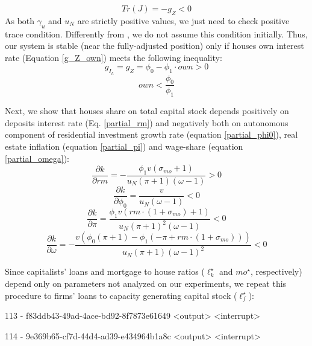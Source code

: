 \documentclass[11pt]{article}
\begin{document}
$$
Tr(J) = -g_Z < 0
$$
As both \(\gamma_u\) and \(u_N\) are strictly positive values, we just need to check positive trace condition.
Differently from \textcite{freitas_growth_2015}, we do not assume this condition initially.
Thus, our system is stable (near the fully-adjusted position) only if houses own interest rate (Equation \ref{g_Z_own}) meets the following inequality:
$$
g_{I_h} = g_Z = \phi_0 - \phi_1\cdot own > 0
$$
\begin{equation}
own < \frac{\phi_0}{\phi_1}
\end{equation}


Next, we show that houses share on total capital stock depends positively on deposits interest rate (Eq. \ref{partial_rm}) and negatively both on autonomous component of residential investment growth rate (equation \ref{partial_phi0}), real estate inflation (equation \ref{partial_pi}) and wage-share (equation \ref{partial_omega}):
\begin{equation}
\label{partial_rm}
\frac{\partial k}{\partial rm} = - \frac{\phi_{1} v \left(\sigma_{mo} + 1\right)}{u_N \left(\pi + 1\right) \left(\omega - 1\right)} > 0
\end{equation}
\begin{equation}
\label{partial_phi0}
\frac{\partial k}{\partial \phi_0} = \frac{v}{u_N \left(\omega - 1\right)} < 0
\end{equation}
\begin{equation}
\label{partial_pi}
\frac{\partial k}{\partial \pi} = \frac{\phi_{1} v \left(rm\cdot(1+\sigma_{mo}) + 1\right)}{u_N \left(\pi + 1\right)^{2} \left(\omega - 1\right)} < 0
\end{equation}
\begin{equation}
\label{partial_omega}
\frac{\partial k}{\partial \omega} = - \frac{v \left(\phi_{0} \left(\pi + 1\right) - \phi_{1} \left(- \pi + rm\cdot(1 + \sigma_{mo})\right)\right)}{u_N \left(\pi + 1\right) \left(\omega - 1\right)^{2}} < 0
\end{equation}


Since capitalists' loans and mortgage to house ratios (\(\ell^{\star}_{k}\) and \(mo^{\star}\), respectively) depend only on parameters not analyzed on our experiments, we repeat this  procedure to firms' loans to capacity generating capital stock (\(\ell^{\star}_f\)):


113 - f83ddb43-49ad-4ace-bd92-8f7873e61649 <output> <interrupt>

114 - 9e369b65-cf7d-44d4-ad39-e434964b1a8c <output> <interrupt>
\end{document}
